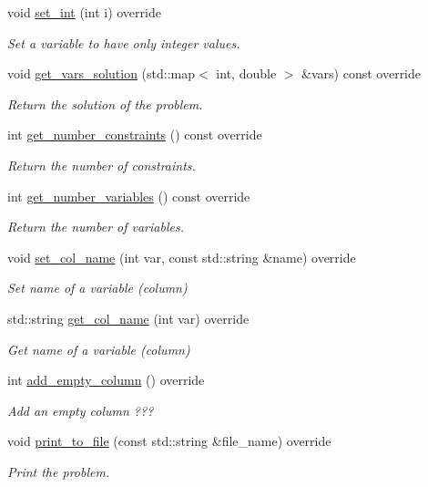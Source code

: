 \begin{DoxyCompactItemize}
void \hyperlink{classglpk__solver_a036f03d3c3fb34341846be7f077b565d}{set\+\_\+int} (int i) override
\begin{DoxyCompactList}\small\item\em Set a variable to have only integer values. \end{DoxyCompactList}\item 
void \hyperlink{classglpk__solver_a7164da0eb8d9fed8b7cefe548b2f6ee3}{get\+\_\+vars\+\_\+solution} (std\+::map$<$ int, double $>$ \&vars) const override
\begin{DoxyCompactList}\small\item\em Return the solution of the problem. \end{DoxyCompactList}\item 
int \hyperlink{classglpk__solver_ab92636d941e8052c7a24f8fc7de12eb8}{get\+\_\+number\+\_\+constraints} () const override
\begin{DoxyCompactList}\small\item\em Return the number of constraints. \end{DoxyCompactList}\item 
int \hyperlink{classglpk__solver_a331a217a8d51011ad68bfd97c6844778}{get\+\_\+number\+\_\+variables} () const override
\begin{DoxyCompactList}\small\item\em Return the number of variables. \end{DoxyCompactList}\item 
void \hyperlink{classglpk__solver_aaed1f108a4909b6697fe7a5483bb259a}{set\+\_\+col\+\_\+name} (int var, const std\+::string \&name) override
\begin{DoxyCompactList}\small\item\em Set name of a variable (column) \end{DoxyCompactList}\item 
std\+::string \hyperlink{classglpk__solver_a00812df3ae9f05cbddd617425d8398da}{get\+\_\+col\+\_\+name} (int var) override
\begin{DoxyCompactList}\small\item\em Get name of a variable (column) \end{DoxyCompactList}\item 
int \hyperlink{classglpk__solver_a7f8f325055100b3b9a9d115b5bb2a613}{add\+\_\+empty\+\_\+column} () override
\begin{DoxyCompactList}\small\item\em Add an empty column ??? \end{DoxyCompactList}\item 
void \hyperlink{classglpk__solver_aaee0e321445ea081d26952772e4e2eef}{print\+\_\+to\+\_\+file} (const std\+::string \&file\+\_\+name) override
\begin{DoxyCompactList}\small\item\em Print the problem. \end{DoxyCompactList}\end{DoxyCompactItemize}
